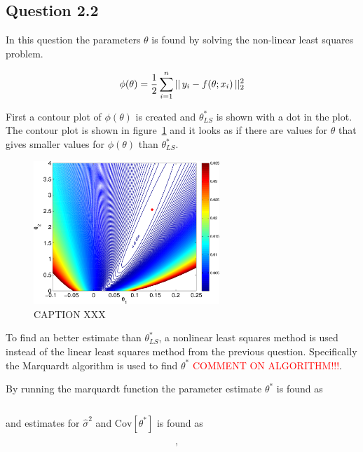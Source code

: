 \subsection*{Question 2.2}

In this question the parameters $\theta$ is found by solving the non-linear least squares problem.

\begin{equation*}
    \phi(\theta) = \frac{1}{2}\sum_{i=1}^n ||\,y_i - f(\theta; x_i)\,||_2^2
\end{equation*}

First a contour plot of $\phi(\theta)$ is created and $\theta_{LS}^*$ is shown with a dot in the plot. The contour plot is shown in figure~\ref{fig:ex22-contour-linear} and it looks as if there are values for $\theta$ that gives smaller values for $\phi(\theta)$ than $\theta_{LS}^*$.

\begin{figure}[ht]
    \centering
    \includegraphics[width=70mm]{../media/ex22-contour-linear.pdf}
    \caption{CAPTION XXX}
    \label{fig:ex22-contour-linear}
\end{figure}

To find an better estimate than $\theta_{LS}^*$, a nonlinear least squares method is used instead of the linear least squares method from the previous question. Specifically the Marquardt algorithm is used to find $\theta^*$ {\textcolor{red}{COMMENT ON ALGORITHM!!!}}.

By running the marquardt function the parameter estimate $\theta^*$ is found as

\begin{equation*}
    
\end{equation*}

and estimates for $\hat{\sigma}^2$ and $\text{Cov}[\theta^*]$ is found as

\begin{equation*}
    , \quad 
\end{equation*}

